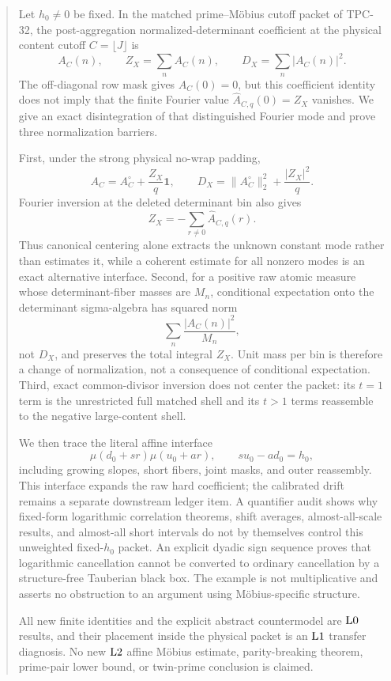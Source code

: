 \begin{abstract}
Let \(h_0\ne0\) be fixed.  In the matched prime--M\"obius cutoff
packet of TPC-32, the post-aggregation normalized-determinant
coefficient at the physical content cutoff \(C=\lfloor J\rfloor\) is
\[
 A_C(n),\qquad
 Z_X=\sum_nA_C(n),\qquad
 D_X=\sum_n|A_C(n)|^2.
\]
The off-diagonal row mask gives \(A_C(0)=0\), but this coefficient
identity does not imply that the finite Fourier value
\(\widehat A_{C,q}(0)=Z_X\) vanishes.  We give an exact
disintegration of that distinguished Fourier mode and prove three
normalization barriers.

First, under the strong physical no-wrap padding,
\[
 A_C=A_C^\circ+\frac{Z_X}{q}\mathbf 1,\qquad
 D_X=\|A_C^\circ\|_2^2+\frac{|Z_X|^2}{q}.
\]
Fourier inversion at the deleted determinant bin also gives
\[
 Z_X=-\sum_{r\ne0}\widehat A_{C,q}(r).
\]
Thus canonical centering alone extracts the unknown constant mode
rather than estimates it, while a coherent estimate for all nonzero
modes is an exact alternative interface.  Second, for a positive raw
atomic measure whose
determinant-fiber masses are \(M_n\), conditional expectation onto the
determinant sigma-algebra has squared norm
\[
 \sum_n\frac{|A_C(n)|^2}{M_n},
\]
not \(D_X\), and preserves the total integral \(Z_X\).  Unit mass per
bin is therefore a change of normalization, not a consequence of
conditional expectation.  Third, exact common-divisor inversion does
not center the packet: its \(t=1\) term is the unrestricted full
matched shell and its \(t>1\) terms reassemble to the negative
large-content shell.

We then trace the literal affine interface
\[
 \mu(d_0+sr)\mu(u_0+ar),\qquad su_0-ad_0=h_0,
\]
including growing slopes, short fibers, joint masks, and outer
reassembly.  This interface expands the raw hard coefficient; the
calibrated drift remains a separate downstream ledger item.  A
quantifier audit shows why fixed-form logarithmic
correlation theorems, shift averages, almost-all-scale results, and
almost-all short intervals do not by themselves control this
unweighted fixed-\(h_0\) packet.  An explicit dyadic sign sequence
proves that logarithmic cancellation cannot be converted to ordinary
cancellation by a structure-free Tauberian black box.  The example is
not multiplicative and asserts no obstruction to an argument using
M\"obius-specific structure.

All new finite identities and the explicit abstract countermodel are
\(\Lzero\) results, and their placement inside the physical packet is
an \(\Lone\) transfer diagnosis.  No new \(\Ltwo\) affine M\"obius
estimate, parity-breaking theorem, prime-pair lower bound, or
twin-prime conclusion is claimed.
\end{abstract}

